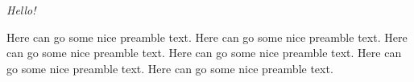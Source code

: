 {\itshape 
Hello!

Here can go some nice preamble text. Here can go some nice preamble text.
Here can go some nice preamble text. Here can go some nice preamble text.
Here can go some nice preamble text. Here can go some nice preamble text.}